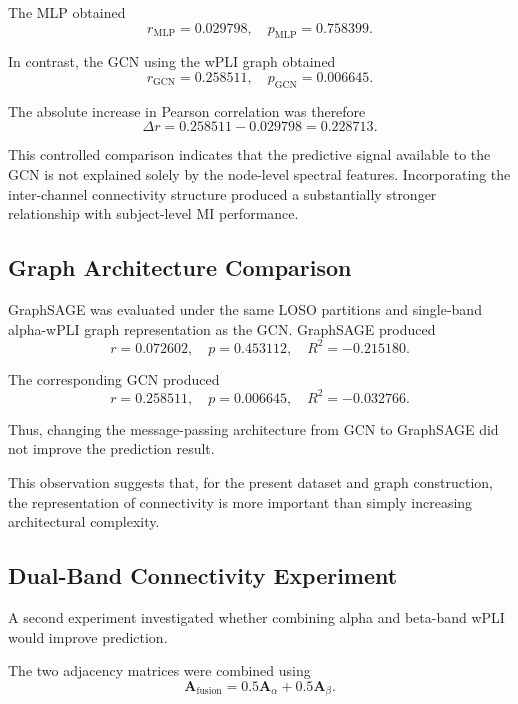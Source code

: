 \documentclass[conference]{IEEEtran}
\begin{document}
The MLP obtained
\begin{equation}
r_{\text{MLP}} = 0.029798, \quad p_{\text{MLP}} = 0.758399.
\end{equation}

In contrast, the GCN using the wPLI graph obtained
\begin{equation}
r_{\text{GCN}} = 0.258511, \quad p_{\text{GCN}} = 0.006645.
\end{equation}

The absolute increase in Pearson correlation was therefore
\begin{equation}
\Delta r = 0.258511 - 0.029798 = 0.228713.
\end{equation}

This controlled comparison indicates that the predictive signal available to the GCN is not explained solely by the node-level spectral features. Incorporating the inter-channel connectivity structure produced a substantially stronger relationship with subject-level MI performance.

\subsection{Graph Architecture Comparison}
GraphSAGE was evaluated under the same LOSO partitions and single-band alpha-wPLI graph representation as the GCN. GraphSAGE produced
\begin{equation}
r = 0.072602, \quad p = 0.453112, \quad R^2 = -0.215180.
\end{equation}

The corresponding GCN produced
\begin{equation}
r = 0.258511, \quad p = 0.006645, \quad R^2 = -0.032766.
\end{equation}

Thus, changing the message-passing architecture from GCN to GraphSAGE did not improve the prediction result.

This observation suggests that, for the present dataset and graph construction, the representation of connectivity is more important than simply increasing architectural complexity.

\subsection{Dual-Band Connectivity Experiment}
A second experiment investigated whether combining alpha and beta-band wPLI would improve prediction.

The two adjacency matrices were combined using
\begin{equation}
\mathbf{A}_{\text{fusion}} = 0.5\mathbf{A}_{\alpha} + 0.5\mathbf{A}_{\beta}.
\end{equation}
\end{document}

